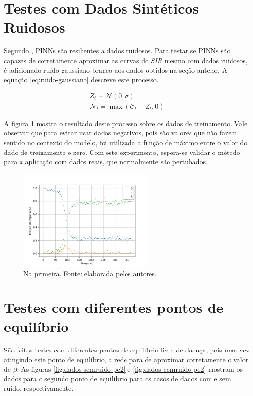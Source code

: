 \section{Testes com Dados Sintéticos Ruidosos}

Segundo \cite{raissi-etal:19}, PINNs são resilientes a dados ruidosos. Para
testar se PINNs são capazes de corretamente aproximar as curvas do \textit{SIR}
mesmo com dados ruidosos,
é adicionado ruído gaussiano branco aos dados obtidos na seção anteior.
A equação \ref{eq:ruido-gaussiano} descreve este processo.

\begin{eqnarray}\label{eq:ruido-gaussiano}
    Z_t \sim \mathcal{N}(0, \sigma) \\
    \mathcal{N}_t = \max(\mathcal{C}_t + Z_t, 0)  
\end{eqnarray}

A figura \ref{fig:dados-comruido} mostra o resultado deste processo sobre os dados
de treinamento. Vale observar que para evitar usar dados negativos, pois são valores
que não fazem sentido no contexto do modelo, foi utilizada a função de máximo
entre o valor do dado de treinamento e zero.
Com este experimento, espera-se validar o método para a aplicação com dados reais,
que normalmente são pertubados. 

\begin{figure}[htpb]
\centering
\includegraphics[width=0.6\textwidth]{figuras/runge-kutta-compartiments-data-sir-noisy.png}
\caption{Na primeira. Fonte: elaborada pelos autores.}
\label{fig:dados-comruido}
\end{figure}


\section{Testes com diferentes pontos de equilíbrio}

São feitos testes com diferentes pontos de equilíbrio livre de doença, pois uma 
vez atingindo este ponto de equilíbrio, a rede para de aproximar corretamente o 
valor de $\beta$. As figuras \ref{fig:dados-semruido-pe2} e \ref{fig:dados-comruido-pe2}
mostram os dados para o segundo ponto de equilíbrio para os casos de dados com
e sem ruído, respectivamente.  

